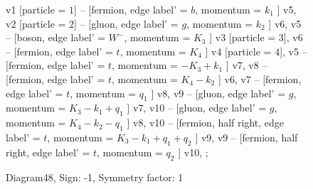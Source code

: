 \documentclass{revtex4}
\begin{document}
\begin{figure}[!htb]
\begin{center}
{    %
v1 [particle = \(1\)] -- [fermion, edge label' = \(b\), momentum = \(k_{1}\) ] v5, 
v2 [particle = \(2\)] -- [gluon, edge label' = \(g\), momentum = \(k_{2}\) ] v6, 
v5 -- [boson, edge label' = \(W^{-}\), momentum = \(K_{3}\) ] v3 [particle = \(3\)], 
v6 -- [fermion, edge label' = \(t\), momentum = \(K_{4}\) ] v4 [particle = \(4\)], 
v5 -- [fermion, edge label' = \(t\), momentum = \(-K_{3} + k_{1}\) ] v7, 
v8 -- [fermion, edge label' = \(t\), momentum = \(K_{4} - k_{2}\) ] v6, 
v7 -- [fermion, edge label' = \(t\), momentum = \(q_{1}\) ] v8, 
v9 -- [gluon, edge label' = \(g\), momentum = \(K_{3} - k_{1} + q_{1}\) ] v7, 
v10 -- [gluon, edge label' = \(g\), momentum = \(K_{4} - k_{2} - q_{1}\) ] v8, 
v10 -- [fermion, half right, edge label' = \(t\), momentum = \(K_{3} - k_{1} + q_{1} + q_{2}\) ] v9, 
v9 -- [fermion, half right, edge label' = \(t\), momentum = \(q_{2}\) ] v10, 
};
\end{center}
\caption{Diagram48, Sign: -1, Symmetry factor: 1}
\end{figure}
\newpage
\end{document}
